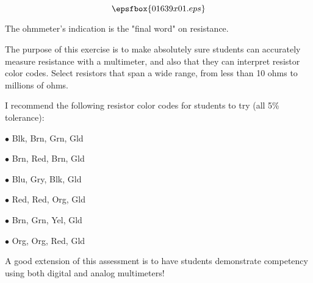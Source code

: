 

$$\epsfbox{01639x01.eps}$$

\vfil \eject






The ohmmeter's indication is the "final word" on resistance.







The purpose of this exercise is to make absolutely sure students can accurately measure resistance with a multimeter, and also that they can interpret resistor color codes.  Select resistors that span a wide range, from less than 10 ohms to millions of ohms.

I recommend the following resistor color codes for students to try (all 5\% tolerance):

\medskip
\item{$\bullet$} Blk, Brn, Grn, Gld
\item{$\bullet$} Brn, Red, Brn, Gld
\item{$\bullet$} Blu, Gry, Blk, Gld
\item{$\bullet$} Red, Red, Org, Gld
\item{$\bullet$} Brn, Grn, Yel, Gld
\item{$\bullet$} Org, Org, Red, Gld
\medskip

A good extension of this assessment is to have students demonstrate competency using both digital and analog multimeters!




